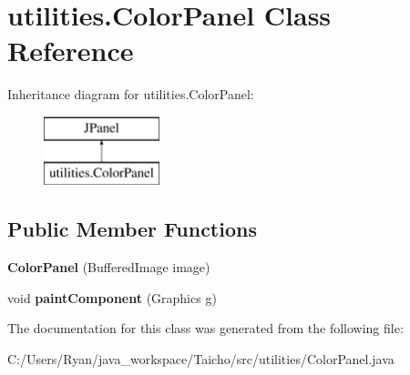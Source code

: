 \hypertarget{classutilities_1_1_color_panel}{\section{utilities.\-Color\-Panel Class Reference}
\label{classutilities_1_1_color_panel}
}
Inheritance diagram for utilities.\-Color\-Panel\-:\begin{figure}[H]
\begin{center}
\leavevmode
\includegraphics[height=2.000000cm]{classutilities_1_1_color_panel}
\end{center}
\end{figure}
\subsection*{Public Member Functions}
\begin{DoxyCompactItemize}
\item 
\hypertarget{classutilities_1_1_color_panel_ab5b96a156703c6ac00879ab0acd7a97a}{{\bfseries Color\-Panel} (Buffered\-Image image)}\label{classutilities_1_1_color_panel_ab5b96a156703c6ac00879ab0acd7a97a}

\item 
\hypertarget{classutilities_1_1_color_panel_a677dd343f19aeab2cc059a4f993993a5}{void {\bfseries paint\-Component} (Graphics g)}\label{classutilities_1_1_color_panel_a677dd343f19aeab2cc059a4f993993a5}

\end{DoxyCompactItemize}


The documentation for this class was generated from the following file\-:\begin{DoxyCompactItemize}
\item 
C\-:/\-Users/\-Ryan/java\-\_\-workspace/\-Taicho/src/utilities/Color\-Panel.\-java\end{DoxyCompactItemize}
